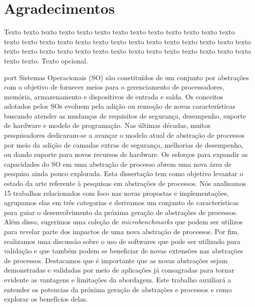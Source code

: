 \chapter*{Agradecimentos}

Texto texto texto texto texto texto texto texto texto texto texto texto texto
texto texto texto texto texto texto texto texto texto texto texto texto texto
texto texto texto texto texto texto texto texto texto texto texto texto texto
texto texto texto texto. Texto opcional.

\begin{resumo}{port}
Sistemas Operacionais (SO) são constituídos de um conjunto por abstrações com o
objetivo de fornecer meios para o gerenciamento de processadores, memória,
armazenamento e dispositivos de entrada e saída. Os conceitos adotados pelos SOs evoluem pela
adição ou remoção de novas características buscando atender as mudanças de
requisitos de segurança, desempenho, suporte de hardware e modelo de
programação. Nas últimas décadas, muitos pesquisadores dedicaram-se a
avançar o modelo atual de abstração de processos por meio da adição de camadas
extras de segurança, melhorias de desempenho, ou dando suporte para novos
recursos de hardware. Os esforços para expandir as capacidades do SO em uma
abstração de processo abrem uma nova área de pesquisa ainda pouco explorada.
Esta dissertação tem como objetivo levantar o estado da arte referente à
pesquisas em abstrações de processos. Nós analisamos 15 trabalhos relacionados
com foco nas novas propostas e implementações, agrupamos elas em três
categorias e derivamos um conjunto de características para guiar o
desenvolvimento da próxima geração de abstrações de processos. Além disso,
sugerimos uma coleção de \emph{microbenchmarks} que podem ser utilizos para
revelar parte dos impactos de uma nova abstração de processos. Por fim,
realizamos uma discussão sobre o uso de softwares que pode ser utilizado para
validação e que também podem se beneficiar de novas extensões nas abstrações de
processos.  Destacamos que é importante que as novas abstrações sejam
demonstradas e validadas por meio de aplicações já consagradas para tornar
evidente as vantagens e limitações da abordagem. Este trabalho auxiliará a
entender os potencias da próxima geração de abstrações e processos e como
explorar os benefícios delas.
\end{resumo}

